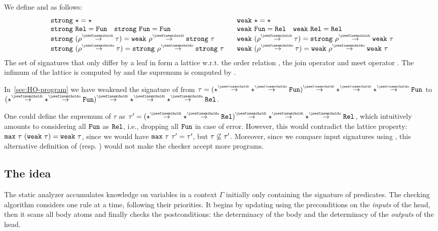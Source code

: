 We define \minimize and \maximize as follows:
%
$$
\begin{array}{l}
\minimize\ \star = \star\\
\minimize\ \relI = \detI \quad
\minimize\ \detI = \detI\\
\minimize\ (\rho \toI \tau) = \maximize\ \rho \toI \minimize\ \tau\\
\minimize\ (\rho \toO \tau) = \minimize\ \rho \toO \minimize\ \tau
\end{array}
\;\;\;
\begin{array}{l}
\maximize\ \star = \star\\
\maximize\ \detI = \relI\quad
\maximize\ \relI = \relI \\
\maximize\ (\rho \toI \tau) = \minimize\ \rho \toI \maximize\ \tau \\
\maximize\ (\rho \toO \tau) = \maximize\ \rho \toO \maximize\ \tau 
\end{array}
$$
%
The set of signatures that only differ by a leaf in \func[] form a lattice
w.r.t. the order relation \mySub, the join operator \maxT and meet operator
\minT. The infimum of the lattice is computed by \minimize and the supremum
is computed by \maximize.

In~\cref{sec:HO-program} we have weakened the signature of 
from $\tau = (\star \toI \star \toO \detI) \toI \star \toI \star \toO \detI$
to $(\star \toI \star \toO \detI) \toI \star \toI \star \toO \relI$.

One could define the supremum of $\tau$ as
$\tau' = (\star \toI \star \toO \relI) \toI \star \toI \star \toO \relI$,
which intuitively amounts to considering all $\texttt{Fun}$ as $\texttt{Rel}$, i.e., dropping
all $\texttt{Fun}$ in case of error. 
However, this would contradict the lattice
property: $\maxT\ \tau\ (\maximize\ \tau) = \maximize\ \tau$, since we would
have $\texttt{max}\ \tau\ \tau' = \tau'$, but $\tau \not\subseteq \tau'$. Moreover, since
we compare input signatures using \mySub, this alternative definition of 
\maximize (resp. \minimize) would not make the checker accept more
programs.

\subsection{The idea}

The static analyzer accumulates
knowledge on variables in a context $\Gamma$ initially only containing the signature
of predicates. The checking algorithm considers one rule at a time, following
their priorities.
It begins by updating \ctx using the preconditions
on the \emph{inputs} of the head, then it scans all body atoms
and finally checks the postconditions: the determinacy of the body
and the determinacy of the \emph{outputs} of the head.

